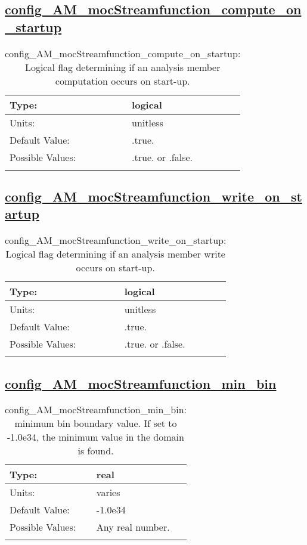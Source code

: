\subsection[config\_AM\_mocStreamfunction\_compute\_on\_startup]{\hyperref[sec:nm_tab_AM_mocStreamfunction]{config\_AM\_mocStreamfunction\_compute\_on\_startup}}
\label{subsec:nm_sec_config_AM_mocStreamfunction_compute_on_startup}
\begin{center}
\begin{longtable}{| p{2.0in} || p{4.0in} |}
    \hline
    Type: & logical \\
    \hline
    Units: & \si{unitless} \\
    \hline
    Default Value: & .true. \\
    \hline
    Possible Values: & .true. or .false. \\
    \hline
    \caption{config\_AM\_mocStreamfunction\_compute\_on\_startup: Logical flag determining if an analysis member computation occurs on start-up.}
\end{longtable}
\end{center}
\subsection[config\_AM\_mocStreamfunction\_write\_on\_startup]{\hyperref[sec:nm_tab_AM_mocStreamfunction]{config\_AM\_mocStreamfunction\_write\_on\_startup}}
\label{subsec:nm_sec_config_AM_mocStreamfunction_write_on_startup}
\begin{center}
\begin{longtable}{| p{2.0in} || p{4.0in} |}
    \hline
    Type: & logical \\
    \hline
    Units: & \si{unitless} \\
    \hline
    Default Value: & .true. \\
    \hline
    Possible Values: & .true. or .false. \\
    \hline
    \caption{config\_AM\_mocStreamfunction\_write\_on\_startup: Logical flag determining if an analysis member write occurs on start-up.}
\end{longtable}
\end{center}
\subsection[config\_AM\_mocStreamfunction\_min\_bin]{\hyperref[sec:nm_tab_AM_mocStreamfunction]{config\_AM\_mocStreamfunction\_min\_bin}}
\label{subsec:nm_sec_config_AM_mocStreamfunction_min_bin}
\begin{center}
\begin{longtable}{| p{2.0in} || p{4.0in} |}
    \hline
    Type: & real \\
    \hline
    Units: & \si{varies} \\
    \hline
    Default Value: & -1.0e34 \\
    \hline
    Possible Values: & Any real number. \\
    \hline
    \caption{config\_AM\_mocStreamfunction\_min\_bin: minimum bin boundary value.  If set to -1.0e34, the minimum value in the domain is found.}
\end{longtable}
\end{center}
